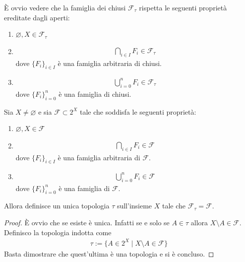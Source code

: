 \begin{remark}
	È ovvio vedere che la famiglia dei chiusi $\mathcal{F}_\tau$ rispetta le seguenti proprietà ereditate dagli aperti:
	\begin{enumerate}
		\item $\varnothing, X \in \mathcal{F}_\tau$
		\item \begin{equation}
		\begin{aligned}
			\bigcap_{i \in I} F_i \in \mathcal{F}_\tau
		\end{aligned}
		\end{equation}
		dove $\{F_i\}_{i\in I}$ è una famiglia arbitraria di chiusi.
		\item \begin{equation}
		\begin{aligned}
		\bigcup^{n}_{i = 0} F_i \in \mathcal{F}_\tau
		\end{aligned}
		\end{equation}
		dove $\{F_i\}^n_{i=0}$ è una famiglia di chiusi.
	\end{enumerate}
\end{remark}

\begin{lemma}
	Sia $X \neq \varnothing$ e sia $\mathcal{F} \subset 2^X$ tale che soddisfa le seguenti proprietà:
		\begin{enumerate}
		\item $\varnothing, X \in \mathcal{F}$
		\item \begin{equation}
		\begin{aligned}
		\bigcap_{i \in I} F_i \in \mathcal{F}
		\end{aligned}
		\end{equation}
		dove $\{F_i\}_{i\in I}$ è una famiglia arbitraria di $\mathcal{F}$.
		\item \begin{equation}
		\begin{aligned}
		\bigcup^{n}_{i = 0} F_i \in \mathcal{F}
		\end{aligned}
		\end{equation}
		dove $\{F_i\}^n_{i=0}$ è una famiglia di $\mathcal{F}$.
	\end{enumerate}
	Allora definisce un unica topologia $\tau$ sull'insieme $X$ tale che $\mathcal{F}_\tau = \mathcal{F}$.
\end{lemma}
\begin{proof}
	È ovvio che se esiste è unica. Infatti se e solo se $A \in \tau$ allora $X \setminus A \in \mathcal{F}$. Definisco la topologia indotta come 
	\begin{equation}
	\begin{aligned}	
		\tau := \{ A \in 2^X \; | \; X \setminus A \in \mathcal{F} \}
	\end{aligned}
	\end{equation}
	Basta dimostrare che quest'ultima è una topologia e si è concluso.
\end{proof}

